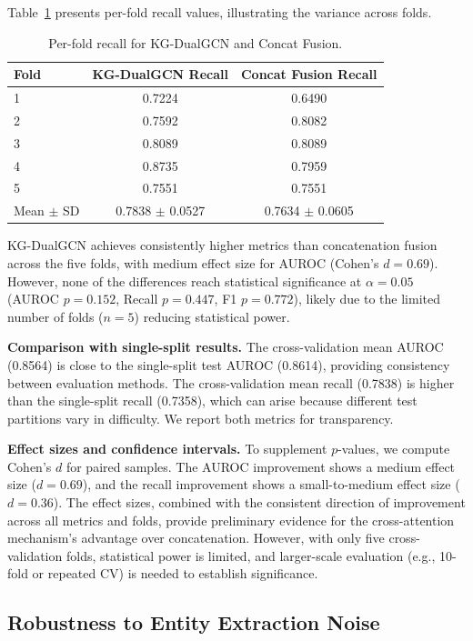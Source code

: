 \documentclass[11pt,onecolumn,a4paper]{article}
\begin{document}
Table~\ref{tab:cv_folds} presents per-fold recall values, illustrating the variance across folds.

\begin{table}[H]
\centering
\caption{Per-fold recall for KG-DualGCN and Concat Fusion.}
\label{tab:cv_folds}
\begin{tabular}{lcc}
\toprule
Fold & KG-DualGCN Recall & Concat Fusion Recall \\
\midrule
1 & 0.7224 & 0.6490 \\
2 & 0.7592 & 0.8082 \\
3 & 0.8089 & 0.8089 \\
4 & 0.8735 & 0.7959 \\
5 & 0.7551 & 0.7551 \\
Mean $\pm$ SD & 0.7838 $\pm$ 0.0527 & 0.7634 $\pm$ 0.0605 \\
\bottomrule
\end{tabular}
\end{table}

KG-DualGCN achieves consistently higher metrics than concatenation fusion across the five folds, with medium effect size for AUROC (Cohen's $d = 0.69$). However, none of the differences reach statistical significance at $\alpha = 0.05$ (AUROC $p = 0.152$, Recall $p = 0.447$, F1 $p = 0.772$), likely due to the limited number of folds ($n = 5$) reducing statistical power.

\textbf{Comparison with single-split results.} The cross-validation mean AUROC (0.8564) is close to the single-split test AUROC (0.8614), providing consistency between evaluation methods. The cross-validation mean recall (0.7838) is higher than the single-split recall (0.7358), which can arise because different test partitions vary in difficulty. We report both metrics for transparency.

\textbf{Effect sizes and confidence intervals.} To supplement $p$-values, we compute Cohen's $d$ for paired samples. The AUROC improvement shows a medium effect size ($d = 0.69$), and the recall improvement shows a small-to-medium effect size ($d = 0.36$). The effect sizes, combined with the consistent direction of improvement across all metrics and folds, provide preliminary evidence for the cross-attention mechanism's advantage over concatenation. However, with only five cross-validation folds, statistical power is limited, and larger-scale evaluation (e.g., 10-fold or repeated CV) is needed to establish significance.

\subsection{Robustness to Entity Extraction Noise}
\end{document}
